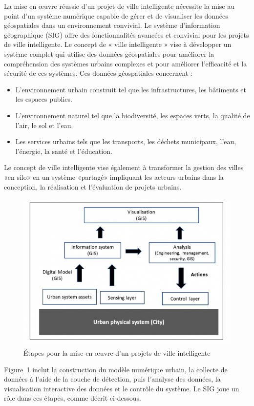 \documentclass[french, a4paper, 12pt]{report}
\begin{document}
La mise en œuvre réussie d'un projet de ville intelligente nécessite la mise au point d'un système numérique capable de gérer et de visualiser les données géospatiales dans un environnement convivial. Le système d'information géographique (SIG) offre des fonctionnalités avancées et convivial pour les projets de ville intelligente.
Le concept de « ville intelligente » vise à développer un système complet qui utilise des données géospatiales pour améliorer la compréhension des systèmes urbains complexes et pour améliorer l’efficacité et la sécurité de ces systèmes. 
Ces données géospatiales concernent :
\begin{itemize}
\item \textbf{} L’environnement urbain construit tel que les infrastructures, les bâtiments et les espaces publics.
\item \textbf{} L’environnement naturel tel que la biodiversité, les espaces verts, la qualité de l’air, le sol et l’eau.
\item \textbf{} Les services urbains tels que les transports, les déchets municipaux, l’eau, l’énergie, la santé et l’éducation. 
\end{itemize} 
Le concept de ville intelligente vise également à transformer la gestion des villes «en silo» en un système «partagé» impliquant les acteurs urbains dans la conception, la réalisation et l’évaluation de projets urbains.
\begin{figure}[!ht]
    \centering
    \includegraphics[height=8cm]{images/Steps.png}
    \caption{Étapes pour la mise en œuvre d’un projets de ville intelligente}
    \label{fig:2.1}
\end{figure}
Figure~\ref{fig:2.1} inclut la construction du modèle numérique urbain, la collecte de données à l'aide de la couche de détection, puis l'analyse des données, la visualisation interactive des données et le contrôle du système. Le SIG joue un rôle dans ces étapes, comme décrit ci-dessous. 
\end{document}
